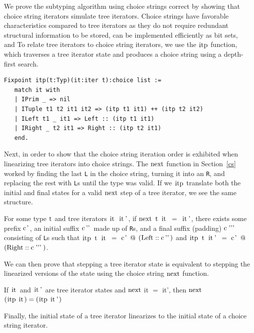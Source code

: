 \documentclass[a4paper,english]{lipics-v2019}
\renewcommand{\L}{{\tt L}\xspace}
\newcommand{\Ls}{{\tt L}s\xspace}
\newcommand{\R}{{\tt R}\xspace}
\newcommand{\Rs}{{\tt R}s\xspace}
\renewcommand{\c}[1]{\ensuremath{\text{\lstinline{#1}}}\xspace}
\begin{document}
We prove the subtyping algorithm using choice strings correct by 
showing that choice string iterators simulate tree iterators. Choice strings
have favorable characteristics compared to tree iterators as they do not require
redundant structural information to be stored, can be implemented efficiently as 
bit sets, and  To 
relate tree iterators to choice string iterators, we use the \c{itp} 
function, which traverses a tree iterator state and produces a choice
string using a depth-first search.

\begin{small}\begin{lstlisting}
Fixpoint itp(t:Typ)(it:iter t):choice list :=
   match it with
   | IPrim _ => nil
   | ITuple t1 t2 it1 it2 => (itp t1 it1) ++ (itp t2 it2)
   | ILeft t1 _ it1 => Left :: (itp t1 it1)
   | IRight _ t2 it1 => Right :: (itp t2 it1)
   end.
\end{lstlisting}\end{small}
\noindent
Next, in order to show that the choice string iteration order
is exhibited when linearizing tree iterators into choice strings. 
The \c{next} function in Section~\ref{cs} worked by finding the last
\L in the choice string, turning it into an \R, and replacing the rest
with \Ls until the type was valid. If we \c{itp} translate both the initial
and final states for a valid \c{next} step of a tree iterator, we see the same
structure.

\begin{lemma}
\label{lem:snt}
For some type \c{t} and tree iterators \c{it it'}, if \c{next} \c t \c {it} $=$ \c{it'}, there exists some prefix \c{c'}, an initial suffix \c{c''} made up of \Rs, and a final suffix (padding) \c{c'''} consisting of \Ls such that \c{itp t it} $=$ \c{c'} \c @ $(\c{Left} :: \c{c''})$ and \c{itp t it'} $=$ \c{c'} \c @ $(\c{Right} :: \c{c'''})$.
\end{lemma}
\noindent
We can then prove that stepping a tree iterator state is equivalent to
stepping the linearized versions of the state using the choice string
\c{next} function.

\begin{lemma}\label{sctxcorr}
If \c{it} and \c{it'} are tree iterator states and 
\c{next} it $=$ it', then \c{next} $(\c{itp}\;\c{it}) = (\c{itp}\;\c{it'})$
\end{lemma}
\noindent
Finally, the initial state of a tree iterator linearizes to the
initial state of a choice string iterator.
\end{document}
